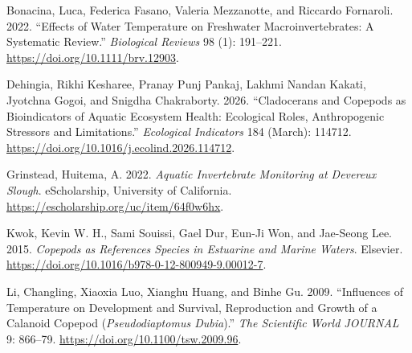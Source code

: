 \documentclass[
  letterpaper,
  DIV=11,
  numbers=noendperiod]{scrartcl}
\newlength{\cslhangindent}
\newenvironment{CSLReferences}[2] %
 {\begin{list}{}{%
  \setlength{\itemindent}{0pt}
  \setlength{\leftmargin}{0pt}
  \setlength{\parsep}{0pt}
  \ifodd #1
   \setlength{\leftmargin}{\cslhangindent}
   \setlength{\itemindent}{-1\cslhangindent}
  \fi
  \setlength{\itemsep}{#2\baselineskip}}}
 {\end{list}}
\begin{document}
\protect{}\label{refs}
\begin{CSLReferences}{1}{1}
Bonacina, Luca, Federica Fasano, Valeria Mezzanotte, and Riccardo
Fornaroli. 2022. {``Effects of Water Temperature on Freshwater
Macroinvertebrates: A Systematic Review.''} \emph{Biological Reviews} 98
(1): 191--221. \url{https://doi.org/10.1111/brv.12903}.

Dehingia, Rikhi Kesharee, Pranay Punj Pankaj, Lakhmi Nandan Kakati,
Jyotchna Gogoi, and Snigdha Chakraborty. 2026. {``Cladocerans and
Copepods as Bioindicators of Aquatic Ecosystem Health: Ecological Roles,
Anthropogenic Stressors and Limitations.''} \emph{Ecological Indicators}
184 (March): 114712.
\url{https://doi.org/10.1016/j.ecolind.2026.114712}.

Grinstead, Huitema, A. 2022. \emph{Aquatic Invertebrate Monitoring at
Devereux Slough}. eScholarship, University of California.
\url{https://escholarship.org/uc/item/64f0w6hx}.

Kwok, Kevin W. H., Sami Souissi, Gael Dur, Eun-Ji Won, and Jae-Seong
Lee. 2015. \emph{Copepods as References Species in Estuarine and Marine
Waters}. Elsevier.
\url{https://doi.org/10.1016/b978-0-12-800949-9.00012-7}.

Li, Changling, Xiaoxia Luo, Xianghu Huang, and Binhe Gu. 2009.
{``Influences of Temperature on Development and Survival, Reproduction
and Growth of a Calanoid Copepod ({\emph{Pseudodiaptomus Dubia}}).''}
\emph{The Scientific World JOURNAL} 9: 866--79.
\url{https://doi.org/10.1100/tsw.2009.96}.

\end{CSLReferences}
\end{document}
